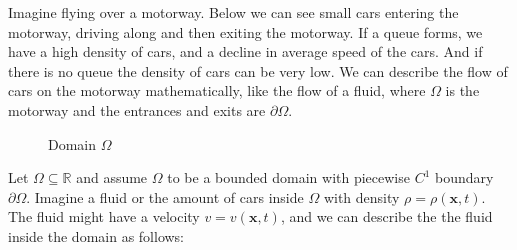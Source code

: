 \documentclass{article}
\numberwithin{equation}{section}
\begin{document}
Imagine flying over a motorway. Below we can see small cars entering the motorway, driving along and then exiting the motorway. If a queue forms, we have a high density of cars, and a decline in average speed of the cars.  And if there is no queue the density of cars can be very low. We can describe the flow of cars on the motorway mathematically, like the flow of a fluid,  where $\Omega$ is the motorway and the entrances and exits are $\partial \Omega$. 

\begin{figure}
    \begin{center}
    \caption{Domain  $\Omega$}
    \label{Fig:ConservationLaws/Domain}
    \end{center}
\end{figure}{}

Let $\Omega \subseteq \mathbb{R}$ and assume $\Omega$ to be a bounded domain with piecewise $C^1$ boundary $\partial \Omega$. Imagine a fluid or the amount of cars inside $\Omega$ with density $\rho = \rho(\boldsymbol{x}, t)$. The fluid might have a velocity $v = v(\boldsymbol x, t)$, and we can describe the the fluid inside the domain as follows:
\end{document}
